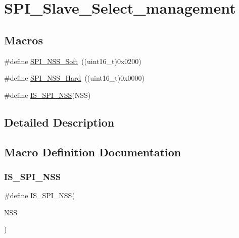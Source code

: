 \hypertarget{group___s_p_i___slave___select__management}{}\section{S\+P\+I\+\_\+\+Slave\+\_\+\+Select\+\_\+management}
\label{group___s_p_i___slave___select__management}
\subsection*{Macros}
\begin{DoxyCompactItemize}
\item 
\#define \mbox{\hyperlink{group___s_p_i___slave___select__management_ga105969ee7eb635414da35b41e942e383}{S\+P\+I\+\_\+\+N\+S\+S\+\_\+\+Soft}}~((uint16\+\_\+t)0x0200)
\item 
\#define \mbox{\hyperlink{group___s_p_i___slave___select__management_ga07c547459d39fb7a6e0322147a60b74a}{S\+P\+I\+\_\+\+N\+S\+S\+\_\+\+Hard}}~((uint16\+\_\+t)0x0000)
\item 
\#define \mbox{\hyperlink{group___s_p_i___slave___select__management_gabbeedf42eccef1bae4f88c606fc3b261}{I\+S\+\_\+\+S\+P\+I\+\_\+\+N\+SS}}(N\+SS)
\end{DoxyCompactItemize}


\subsection{Detailed Description}


\subsection{Macro Definition Documentation}
\mbox{\label{group___s_p_i___slave___select__management_gabbeedf42eccef1bae4f88c606fc3b261}} 
\subsubsection{\texorpdfstring{IS\_SPI\_NSS}{IS\_SPI\_NSS}}
{\footnotesize\ttfamily \#define I\+S\+\_\+\+S\+P\+I\+\_\+\+N\+SS(\begin{DoxyParamCaption}\item[{}]{N\+SS }\end{DoxyParamCaption})}

